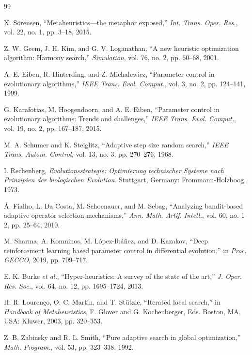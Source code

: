 \documentclass[conference]{IEEEtran}
\begin{document}
\begin{thebibliography}{99}

K. S\"{o}rensen, ``Metaheuristics---the metaphor exposed,'' \emph{Int. Trans. Oper. Res.}, vol. 22, no. 1, pp. 3--18, 2015.

Z. W. Geem, J. H. Kim, and G. V. Loganathan, ``A new heuristic optimization algorithm: Harmony search,'' \emph{Simulation}, vol. 76, no. 2, pp. 60--68, 2001.

A. E. Eiben, R. Hinterding, and Z. Michalewicz, ``Parameter control in evolutionary algorithms,'' \emph{IEEE Trans. Evol. Comput.}, vol. 3, no. 2, pp. 124--141, 1999.

G. Karafotias, M. Hoogendoorn, and A. E. Eiben, ``Parameter control in evolutionary algorithms: Trends and challenges,'' \emph{IEEE Trans. Evol. Comput.}, vol. 19, no. 2, pp. 167--187, 2015.

M. A. Schumer and K. Steiglitz, ``Adaptive step size random search,'' \emph{IEEE Trans. Autom. Control}, vol. 13, no. 3, pp. 270--276, 1968.

I. Rechenberg, \emph{Evolutionsstrategie: Optimierung technischer Systeme nach Prinzipien der biologischen Evolution}. Stuttgart, Germany: Frommann-Holzboog, 1973.

\'{A}. Fialho, L. Da Costa, M. Schoenauer, and M. Sebag, ``Analyzing bandit-based adaptive operator selection mechanisms,'' \emph{Ann. Math. Artif. Intell.}, vol. 60, no. 1--2, pp. 25--64, 2010.

M. Sharma, A. Komninos, M. L\'{o}pez-Ib\'{a}\~{n}ez, and D. Kazakov, ``Deep reinforcement learning based parameter control in differential evolution,'' in \emph{Proc. GECCO}, 2019, pp. 709--717.

E. K. Burke \emph{et al.}, ``Hyper-heuristics: A survey of the state of the art,'' \emph{J. Oper. Res. Soc.}, vol. 64, no. 12, pp. 1695--1724, 2013.

H. R. Louren\c{c}o, O. C. Martin, and T. St\"{u}tzle, ``Iterated local search,'' in \emph{Handbook of Metaheuristics}, F. Glover and G. Kochenberger, Eds. Boston, MA, USA: Kluwer, 2003, pp. 320--353.

Z. B. Zabinsky and R. L. Smith, ``Pure adaptive search in global optimization,'' \emph{Math. Program.}, vol. 53, pp. 323--338, 1992.


\end{thebibliography}
\end{document}
